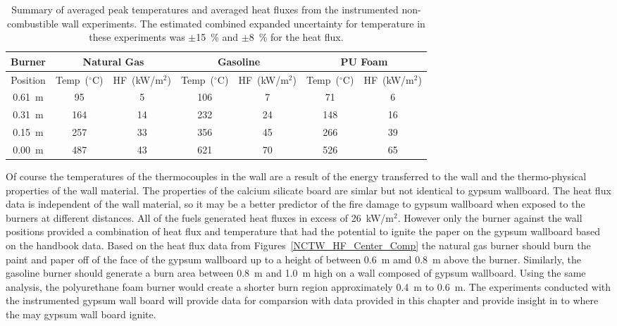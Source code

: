 \documentclass[twoside]{uocthesis}
\begin{document}
{\begin{table}
	\centering
	\footnotesize
	\begin{tabular}{|c|c|c|c|c|c|c|}
		\hline {Burner} & \multicolumn{2}{c}{Natural Gas} & \multicolumn{2}{c}{Gasoline} & \multicolumn{2}{c|}{PU Foam} \\
		\hline  Position & Temp~($^\circ$C) & HF~(kW/m$^{2}$) & Temp~($^\circ$C) & HF~(kW/m$^{2}$) & Temp~($^\circ$C) & HF~(kW/m$^{2}$) 	\\
		\hline \hline 0.61~m & 95 & 5 & 106 & 7 & 71 & 6 \\
		\hline 0.31~m & 164 & 14 & 232 & 24 & 148 & 16	\\
		\hline 0.15~m & 257 & 33 & 356 & 45 & 266 & 39	\\
		\hline 0.00~m & 487 & 43 & 621 & 70 & 526 & 65 	\\
		\hline
	\end{tabular}
	\caption[Summary of instrumented non-combustible wall experiments]{Summary of averaged peak temperatures and averaged heat fluxes from the instrumented non-combustible wall experiments.  The estimated combined expanded uncertainty for temperature in these experiments was $\pm$15~\% and $\pm$8~\% for the heat flux.}
	\label{tab:TW_Summary}
\end{table}


Of course the temperatures of the thermocouples in the wall are a result of the energy transferred to the wall and the thermo-physical properties of the wall material. The properties of the calcium silicate board are simlar but not identical to gypsum wallboard.  The heat flux data is independent of the wall material, so it may be a better predictor of the fire damage to gypsum wallboard when exposed to the burners at different distances.    All of the fuels generated heat fluxes in excess of 26~kW/m$^2$.  However only the burner against the wall positions provided a combination of heat flux and temperature that had the potential to ignite the paper on the gypsum wallboard based on the handbook data.  Based on the heat flux data from Figures~\ref{NCTW_HF_Center_Comp} the natural gas burner should burn the paint and paper off of the face of the gypsum wallboard up to a height of between 0.6~m amd 0.8~m above the burner.  Similarly, the gasoline burner should generate a burn area between 0.8~m and 1.0~m high on a wall composed of gypsum wallboard.  Using the same analysis, the polyurethane foam burner would create a shorter burn region approximately 0.4~m to 0.6~m.  The experiments conducted with the instrumented gypsum wall board will provide data for comparsion with data provided in this chapter and provide insight in to where the may gypsum wall board ignite. 


}
\end{document}
